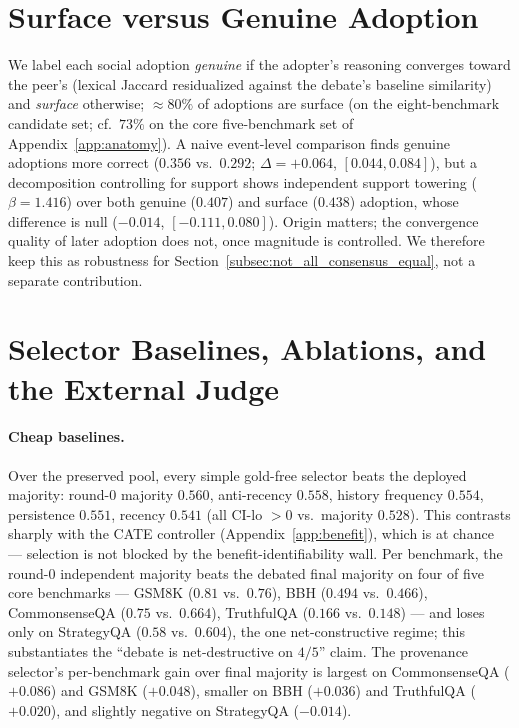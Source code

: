 \section{Surface versus Genuine Adoption}
\label{app:surface}

We label each social adoption \emph{genuine} if the adopter's reasoning converges toward the peer's
(lexical Jaccard residualized against the debate's baseline similarity) and \emph{surface} otherwise;
$\approx 80\%$ of adoptions are surface (on the eight-benchmark candidate set; cf.\ $73\%$ on the core
five-benchmark set of Appendix~\ref{app:anatomy}). A naive event-level comparison finds genuine adoptions more correct
($0.356$ vs.\ $0.292$; $\Delta=+0.064$, $[0.044,0.084]$), but a decomposition controlling for support shows
independent support towering ($\beta=1.416$) over both genuine ($0.407$) and surface ($0.438$) adoption,
whose difference is null ($-0.014$, $[-0.111,0.080]$). Origin matters; the convergence quality of later
adoption does not, once magnitude is controlled. We therefore keep this as robustness for
Section~\ref{subsec:not_all_consensus_equal}, not a separate contribution.

\section{Selector Baselines, Ablations, and the External Judge}
\label{app:selectors}

\paragraph{Cheap baselines.}
Over the preserved pool, every simple gold-free selector beats the deployed majority: round-0 majority
$0.560$, anti-recency $0.558$, history frequency $0.554$, persistence $0.551$, recency $0.541$ (all CI-lo
$>0$ vs.\ majority $0.528$). This contrasts sharply with the CATE controller (Appendix~\ref{app:benefit}),
which is at chance --- selection is not blocked by the benefit-identifiability wall. Per benchmark, the
round-0 independent majority beats the debated final majority on four of five core benchmarks --- GSM8K
($0.81$ vs.\ $0.76$), BBH ($0.494$ vs.\ $0.466$), CommonsenseQA ($0.75$ vs.\ $0.664$), TruthfulQA ($0.166$
vs.\ $0.148$) --- and loses only on StrategyQA ($0.58$ vs.\ $0.604$), the one net-constructive regime; this
substantiates the ``debate is net-destructive on $4/5$'' claim. The provenance selector's per-benchmark gain
over final majority is largest on CommonsenseQA ($+0.086$) and GSM8K ($+0.048$), smaller on BBH ($+0.036$)
and TruthfulQA ($+0.020$), and slightly negative on StrategyQA ($-0.014$).

